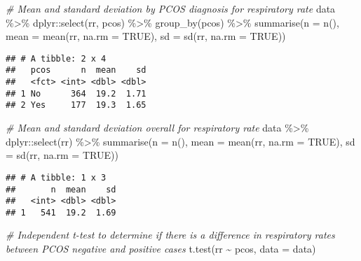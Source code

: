 \documentclass[
]{article}
\newenvironment{Shaded}{\begin{snugshade}}{\end{snugshade}}
\newcommand{\AttributeTok}[1]{\textcolor[rgb]{0.77,0.63,0.00}{#1}}
\newcommand{\CommentTok}[1]{\textcolor[rgb]{0.56,0.35,0.01}{\textit{#1}}}
\newcommand{\ConstantTok}[1]{\textcolor[rgb]{0.00,0.00,0.00}{#1}}
\newcommand{\FunctionTok}[1]{\textcolor[rgb]{0.00,0.00,0.00}{#1}}
\newcommand{\NormalTok}[1]{#1}
\newcommand{\SpecialCharTok}[1]{\textcolor[rgb]{0.00,0.00,0.00}{#1}}
\begin{document}
\begin{Shaded}
\begin{Highlighting}[]
\CommentTok{\# Mean and standard deviation by PCOS diagnosis for respiratory rate}
\NormalTok{data }\SpecialCharTok{\%\textgreater{}\%}\NormalTok{ dplyr}\SpecialCharTok{::}\FunctionTok{select}\NormalTok{(rr, pcos) }\SpecialCharTok{\%\textgreater{}\%} \FunctionTok{group\_by}\NormalTok{(pcos) }\SpecialCharTok{\%\textgreater{}\%} 
  \FunctionTok{summarise}\NormalTok{(}\AttributeTok{n =} \FunctionTok{n}\NormalTok{(), }
            \AttributeTok{mean =} \FunctionTok{mean}\NormalTok{(rr, }\AttributeTok{na.rm =} \ConstantTok{TRUE}\NormalTok{), }
            \AttributeTok{sd =} \FunctionTok{sd}\NormalTok{(rr, }\AttributeTok{na.rm =} \ConstantTok{TRUE}\NormalTok{))}
\end{Highlighting}
\end{Shaded}

\begin{verbatim}
## # A tibble: 2 x 4
##   pcos      n  mean    sd
##   <fct> <int> <dbl> <dbl>
## 1 No      364  19.2  1.71
## 2 Yes     177  19.3  1.65
\end{verbatim}

\begin{Shaded}
\begin{Highlighting}[]
\CommentTok{\# Mean and standard deviation overall for respiratory rate}
\NormalTok{data }\SpecialCharTok{\%\textgreater{}\%}\NormalTok{ dplyr}\SpecialCharTok{::}\FunctionTok{select}\NormalTok{(rr) }\SpecialCharTok{\%\textgreater{}\%} 
  \FunctionTok{summarise}\NormalTok{(}\AttributeTok{n =} \FunctionTok{n}\NormalTok{(), }
            \AttributeTok{mean =} \FunctionTok{mean}\NormalTok{(rr, }\AttributeTok{na.rm =} \ConstantTok{TRUE}\NormalTok{), }
            \AttributeTok{sd =} \FunctionTok{sd}\NormalTok{(rr, }\AttributeTok{na.rm =} \ConstantTok{TRUE}\NormalTok{))}
\end{Highlighting}
\end{Shaded}

\begin{verbatim}
## # A tibble: 1 x 3
##       n  mean    sd
##   <int> <dbl> <dbl>
## 1   541  19.2  1.69
\end{verbatim}

\begin{Shaded}
\begin{Highlighting}[]
\CommentTok{\# Independent t{-}test to determine if there is a difference in respiratory rates between PCOS negative and positive cases}
\FunctionTok{t.test}\NormalTok{(rr }\SpecialCharTok{\textasciitilde{}}\NormalTok{ pcos, }\AttributeTok{data =}\NormalTok{ data)}
\end{Highlighting}
\end{Shaded}
\end{document}
